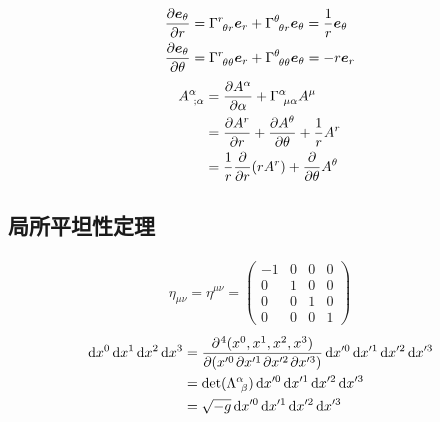 \documentclass[uplatex,dvipdfmx,a4paper,11pt]{jlreq}
\newcommand{\ee}{\bm{e}}
\theoremstyle{definition}
\begin{document}
\begin{example}[極座標]
\begin{align}
    \diffp{\ee_\theta}{r}      & = \Gamma^{r}_{\ \theta r}\ee_r + \Gamma^{\theta}_{\ \theta r}\ee_\theta = \frac{1}{r}\ee_\theta \\
    \diffp{\ee_\theta}{\theta} & = \Gamma^{r}_{\ \theta\theta}\ee_r + \Gamma^{\theta}_{\ \theta\theta}\ee_\theta = -r\ee_r
  \end{align}
  \begin{align}
    A^\alpha_{\ ;\alpha} & = \diffp{A^\alpha}{\alpha} + \Gamma^\alpha_{\ \mu\alpha}A^\mu \\
                         & = \diffp{A^r}{r} + \diffp{A^\theta}{\theta} + \frac{1}{r}A^r  \\
                         & = \frac{1}{r}\diffp{}{r}(rA^r) + \diffp{}{\theta}A^\theta
  \end{align}
\end{example}

\subsection{局所平坦性定理}
\begin{align}
  \eta_{\mu\nu} = \eta^{\mu\nu} = \begin{pmatrix}
                                    -1 & 0 & 0 & 0 \\ 0 & 1 & 0 & 0 \\ 0 & 0 & 1 & 0 \\ 0 & 0 & 0 & 1
                                  \end{pmatrix}
\end{align}
\begin{align}
  \dl{x^0}\dl{x^1}\dl{x^2}\dl{x^3} & = \diffp{(x^0, x^1, x^2, x^3)}{(x'^0, x'^1, x'^2, x'^3)}\dl{x'^0}\dl{x'^1}\dl{x'^2}\dl{x'^3} \\
                                   & = \det(\Lambda^\alpha_{\ \beta})\dl{x'^0}\dl{x'^1}\dl{x'^2}\dl{x'^3}                         \\
                                   & = \sqrt{-g}\dl{x'^0}\dl{x'^1}\dl{x'^2}\dl{x'^3}
\end{align}
\end{document}
